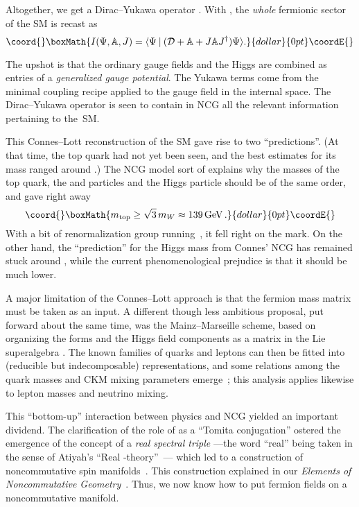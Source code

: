 \documentclass[a4paper,12pt]{article}
\renewcommand{\AA}{\mathbb{A}}      %
\providecommand{\D}{\mathcal{D}}        %
\providecommand{\delslash}{\partial\mkern-9mu/} %
\DeclareMathOperator{\GeV}{GeV}     %
\providecommand{\stroke}{\mathbin\vert} %
\providecommand{\sul}{\mathfrak{su}}    %
\def\top{\mathrm{top}}              %
\providecommand{\x}{\times}             %
\providecommand{\1}{\mathbf{1}}         %
\providecommand{\7}{\dagger}            %
\providecommand{\8}{\bullet}            %
\renewcommand{\.}{\cdot}            %
\renewcommand{\:}{\colon}           %
\def\<#1,#2>{\langle#1\stroke#2\rangle} %
\begin{document}
Altogether, we get a Dirac--Yukawa operator
\myHighlight{$\D = i\delslash \oplus \D_F$}\coordHE{}. With \myHighlight{$\AA := \AA'\,\oplus\,\AA''$}\coordHE{}, the
\textit{whole} fermionic sector of the SM is recast as
$$\coord{}\boxMath{
I(\Psi,\AA,J) = \<\Psi, (\D + \AA + J\AA J^\7) \Psi>.
}{dollar}{0pt}\coordE{}$$

The upshot is that the ordinary gauge fields and the Higgs are
combined as entries of a \textit{generalized gauge potential}. The
Yukawa terms come from the minimal coupling recipe applied to the
gauge field in the internal space. The Dirac--Yukawa operator is seen
to contain in NCG all the relevant information pertaining to the~SM.

This Connes--Lott reconstruction of the SM gave rise to two
``predictions''. (At that time, the top quark had not yet been seen,
and the best estimates for its mass ranged around \myHighlight{$130 \GeV$}\coordHE{}.) The NCG
model sort of explains why the masses of the top quark, the \coordHE{} and
\coordHE{} particles and the Higgs particle should be of the same order, and
gave right away
$$\coord{}\boxMath{
m_\top \geq \sqrt{3}\, m_W \approx 139 \GeV.
}{dollar}{0pt}\coordE{}$$
With a bit of renormalization group running~\cite{Orpheus}, it fell
right on the mark. On the other hand, the ``prediction'' for the Higgs
mass from Connes' NCG has remained stuck around \myHighlight{$200 \GeV$}\coordHE{}, while the
current phenomenological prejudice is that it should be much lower.

A major limitation of the Connes--Lott approach is that the fermion
mass matrix must be taken as an input. A different though less
ambitious proposal, put forward about the same time, was the
Mainz--Marseille scheme, based on organizing the \coordHE{} forms and the
Higgs field components as a \myHighlight{$3 \x 3$}\coordHE{} matrix in the Lie superalgebra
\myHighlight{$\sul(2|1)$}\coordHE{}. The known families of quarks and leptons can then be
fitted into (reducible but indecomposable) \myHighlight{$\sul(2|1)$}\coordHE{}
representations, and some relations among the quark masses and CKM mixing
parameters emerge~\cite{Scheck}; this analysis applies likewise to 
lepton masses and neutrino mixing.

\vspace{6pt}

This ``bottom-up'' interaction between physics and NCG yielded an
important dividend. The clarification of the role of \coordHE{} as a ``Tomita
conjugation'' \cite{Takesaki} ostered the emergence of the concept of
a \textit{real spectral triple} ---the word ``real'' being taken in
the sense of Atiyah's ``Real \coordHE{}-theory''~\cite{AtiyahReal}--- which
led to a construction of noncommutative spin
manifolds~\cite{ConnesCours}. This construction explained in our
\textit{Elements of Noncommutative Geometry}~\cite{Polaris}. Thus, we
now know how to put fermion fields on a noncommutative manifold.
\end{document}
